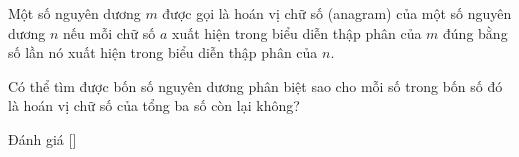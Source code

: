 \ifshowproblem
\begin{problem}\label{problem:BMO-2015-P7}
    Một số nguyên dương \( m \) được gọi là hoán vị chữ số (anagram) của một số nguyên dương \( n \)
    nếu mỗi chữ số \( a \) xuất hiện trong biểu diễn thập phân của \( m \) đúng bằng số lần nó xuất hiện trong biểu diễn thập phân của \( n \).

    Có thể tìm được bốn số nguyên dương phân biệt sao cho mỗi số trong bốn số đó là hoán vị chữ số của tổng ba số còn lại không?
\end{problem}
\fi

\ifshowinfo
Đánh giá [\textbf{}]\footnotemark
{}
\fi